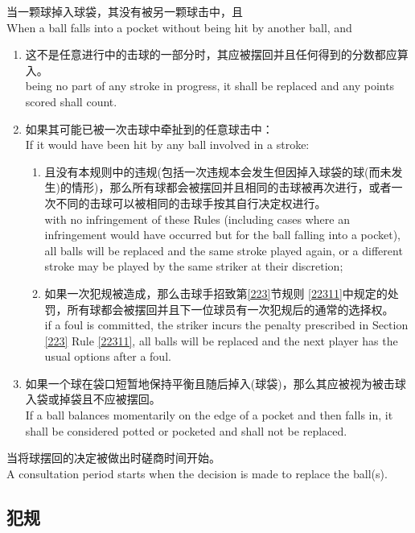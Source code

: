 \noindent 当一颗球掉入球袋，其没有被另一颗球击中，且\\
When a ball falls into a pocket without being hit by another ball, and
\begin{enumerate}[label=(\alph*)]
    \item 这不是任意进行中的击球的一部分时，其应被摆回并且任何得到的分数都应算入。\\
    being no part of any stroke in progress, it shall be replaced and any points scored shall count.
    \item 如果其可能已被一次击球中牵扯到的任意球击中：\\
    If it would have been hit by any ball involved in a stroke:
    \begin{enumerate}[label=(\roman*)]
        \item 且没有本规则中的违规(包括一次违规本会发生但因掉入球袋的球(而未发生)的情形)，那么所有球都会被摆回并且相同的击球被再次进行，或者一次不同的击球可以被相同的击球手按其自行决定权进行。\\
        with no infringement of these Rules (including cases where an infringement would have occurred but for the ball falling into a pocket), all balls will be replaced and the same stroke played again, or a different stroke may be played by the same striker at their discretion;
        \item 如果一次犯规被造成，那么击球手招致第\ref{223}节规则 \ref{22311}中规定的处罚，所有球都会被摆回并且下一位球员有一次犯规后的通常的选择权。\\
        if a foul is committed, the striker incurs the penalty prescribed in Section \ref{223} Rule \ref{22311}, all balls will be replaced and the next player has the usual options after a foul.
    \end{enumerate}
    \item 如果一个球在袋口短暂地保持平衡且随后掉入(球袋)，那么其应被视为被击球入袋或掉袋且不应被摆回。\\
    If a ball balances momentarily on the edge of a pocket and then falls in, it shall be considered potted or pocketed and shall not be replaced.
\end{enumerate}
\noindent 当将球摆回的决定被做出时磋商时间开始。\\
A consultation period starts when the decision is made to replace the ball(s).

\subsection{犯规}\label{22310}

